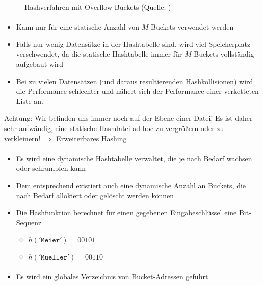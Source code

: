 {\begin{frame}{\insertsection}
\begin{center}
\begin{figure}
			\caption{Hashverfahren mit Overflow-Buckets (Quelle: \cite[S. 611]{EN10})}
		\end{figure}
	\end{center}	
\end{frame}
%
\begin{frame}{\insertsection}
	\framesubtitle{\insertsubsection}
	\begin{itemize}
		\item Kann nur für eine statische Anzahl von $M$ Buckets verwendet werden
		\item Falls nur wenig Datensätze in der Hashtabelle sind, wird viel Speicherplatz 
		verschwendet, da die statische Hashtabelle immer für $M$ Buckets vollständig aufgebaut wird
		\item Bei zu vielen Datensätzen (und daraus resultierenden Hashkollisionen) wird die Performance schlechter und nähert sich der Performance einer verketteten Liste an.
	\end{itemize}
	\alert{Achtung: Wir befinden uns immer noch auf der Ebene einer Datei! Es ist daher sehr aufwändig, eine statische Hashdatei ad hoc zu vergrößern oder zu verkleinern!}	
	$\Rightarrow$ Erweiterbares Hashing	
\end{frame}
%
\begin{frame}{\insertsection}
	\framesubtitle{\insertsubsection}
	\begin{itemize}
		\item Es wird eine dynamische Hashtabelle verwaltet, die je nach Bedarf wachsen oder schrumpfen kann
		\item Dem entsprechend existiert auch eine dynamische Anzahl an Buckets, die nach Bedarf allokiert oder gelöscht werden können
		\item Die Hashfunktion berechnet für einen gegebenen Eingabeschlüssel eine Bit-Sequenz
		\begin{itemize}
			\item $h(\mathtt{'Meier'}) = 0 0 1 0 1$
			\item $h(\mathtt{'Mueller'}) = 0 0 1 1 0$
		\end{itemize}	
	\end{itemize}	
\end{frame}
%
\begin{frame}{\insertsection}
	\framesubtitle{\insertsubsection}
	\begin{itemize}
		\item Es wird ein globales Verzeichnis von Bucket-Adressen geführt 

\end{itemize}
\end{frame}}
